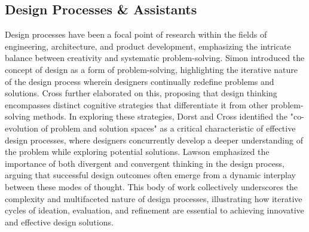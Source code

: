 \documentclass{article}
\begin{document}
\subsection{Design Processes \& Assistants}
Design processes have been a focal point of research within the fields of engineering, architecture, and product development, emphasizing the intricate balance between creativity and systematic problem-solving. Simon \cite{simon1969sciences} introduced the concept of design as a form of problem-solving, highlighting the iterative nature of the design process wherein designers continually redefine problems and solutions. Cross \cite{cross1982designerly} further elaborated on this, proposing that design thinking encompasses distinct cognitive strategies that differentiate it from other problem-solving methods. In exploring these strategies, Dorst and Cross \cite{dorst2001creativity} identified the "co-evolution of problem and solution spaces" as a critical characteristic of effective design processes, where designers concurrently develop a deeper understanding of the problem while exploring potential solutions. Lawson \cite{lawson2005designers} emphasized the importance of both divergent and convergent thinking in the design process, arguing that successful design outcomes often emerge from a dynamic interplay between these modes of thought. This body of work collectively underscores the complexity and multifaceted nature of design processes, illustrating how iterative cycles of ideation, evaluation, and refinement are essential to achieving innovative and effective design solutions.
\end{document}
